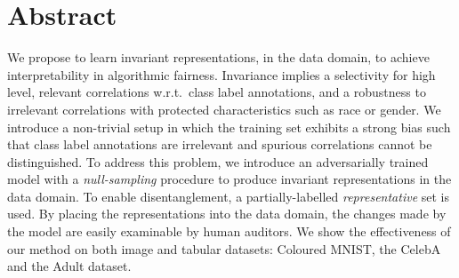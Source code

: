 \section{Abstract}
\noindent
We propose to learn invariant representations, in the data domain, to achieve interpretability in algorithmic fairness. 
Invariance implies a selectivity for high level, relevant correlations w.r.t.\ class label annotations, and a robustness to irrelevant correlations with protected characteristics such as race or gender. 
We introduce a non-trivial setup in which the training set exhibits a strong bias such that class label annotations are irrelevant and spurious correlations cannot be distinguished.
To address this problem, we introduce an adversarially trained model with a \emph{null-sampling} procedure to produce invariant representations in the data domain.
To enable disentanglement, a partially-labelled \emph{representative} set is used.
By placing the representations into the data domain, the changes made by the model are easily examinable by human auditors.
We show the effectiveness of our method on both image and tabular datasets: Coloured MNIST, the CelebA and the Adult dataset.%

